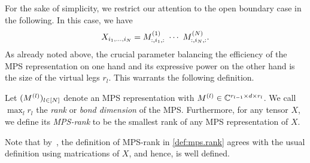 For the sake of simplicity, we restrict our attention to the open boundary case in the following.
In this case, we have
\[
  \label{eq:mps.open_boundary}
  X_{i_1,\ldots,i_N} = M\ind{1}_{:,i_1,:}\ \cdots\  M\ind{N}_{:,i_N,:}.
\]
As already noted above, the crucial parameter balancing the efficiency of the MPS representation on one hand and its expressive power on the other hand is the size of the virtual legs $r_l$.
This warrants the following definition.

\begin{definition}%
  \label{def:mps.rank}
  Let $(M^{(l)})_{l \in [N]}$ denote an MPS representation with $M^{(l)} \in {\mathbb{C}}^{r_{l - 1} \times d \times r_l}$.
  We call $\max_l r_l$ the \emph{rank} or \emph{bond dimension} of the MPS.
  Furthermore, for any tensor $X$, we define its \emph{MPS-rank} to be the smallest rank of any MPS representation of $X$.
\end{definition}

Note that by~\cite[Thm.\ 2.2]{Oseledets_2011_TensorTrain}, the definition of MPS-rank in \cref{def:mps.rank} agrees with the usual definition using matrications of $X$, and hence, is well defined.\\









